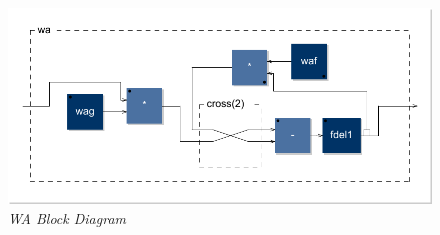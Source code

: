 \documentclass[twoside,a4paper]{article}
\begin{document}
\begin{figure}[ht]
\centerline{\includegraphics[scale=0.5]{img/wa}}
\caption{\label{wa-block}{\it WA Block Diagram}}
\end{figure}


\end{document}
